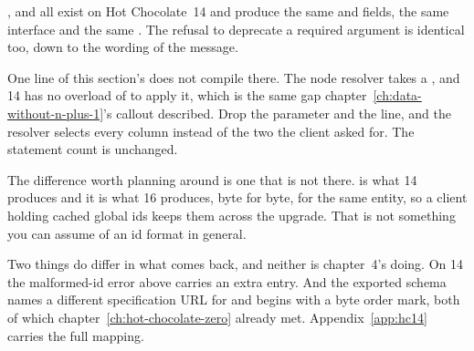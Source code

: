 \begin{onhc14}
, \code{[NodeResolver]} and
\code{[GraphQLDeprecated]} all exist on Hot Chocolate~14 and produce the same
 and  fields, the same  interface and the
same . The refusal to deprecate a required argument is
identical too, down to the wording of the message.

One line of this section's  does not compile there. The
node resolver takes a , and 14 has no
 overload of  to apply it, which is the same gap
chapter~\ref{ch:data-without-n-plus-1}'s callout described. Drop the parameter
and the  line, and the resolver selects every column
instead of the two the client asked for. The statement count is unchanged.

The difference worth planning around is one that is not there.
 is what 14 produces and it is what 16 produces, byte for
byte, for the same entity, so a client holding cached global ids keeps them
across the upgrade. That is not something you can assume of an id format in
general.

Two things do differ in what comes back, and neither is chapter~4's doing. On
14 the malformed-id error above carries an extra  entry. And
the exported schema names a different specification URL for 
and begins with a byte order mark, both of which
chapter~\ref{ch:hot-chocolate-zero} already met.
Appendix~\ref{app:hc14} carries the full mapping.
\end{onhc14}
